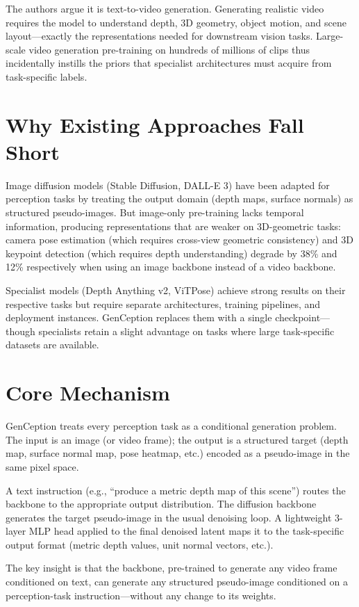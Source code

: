 \documentclass[10pt,twocolumn]{article}
\begin{document}
The authors argue it is text-to-video generation. Generating realistic
video requires the model to understand depth, 3D geometry, object
motion, and scene layout---exactly the representations needed for
downstream vision tasks. Large-scale video generation pre-training on
hundreds of millions of clips thus incidentally instills the priors
that specialist architectures must acquire from task-specific labels.

\section{Why Existing Approaches Fall Short}

Image diffusion models (Stable Diffusion, DALL-E 3) have been adapted
for perception tasks by treating the output domain (depth maps, surface
normals) as structured pseudo-images. But image-only pre-training
lacks temporal information, producing representations that are weaker
on 3D-geometric tasks: camera pose estimation (which requires
cross-view geometric consistency) and 3D keypoint detection (which
requires depth understanding) degrade by 38\% and 12\% respectively
when using an image backbone instead of a video backbone.

Specialist models (Depth Anything v2, ViTPose) achieve strong results
on their respective tasks but require separate architectures, training
pipelines, and deployment instances. GenCeption replaces them with
a single checkpoint---though specialists retain a slight advantage
on tasks where large task-specific datasets are available.

\section{Core Mechanism}

GenCeption treats every perception task as a conditional generation
problem. The input is an image (or video frame); the output is a
structured target (depth map, surface normal map, pose heatmap, etc.)
encoded as a pseudo-image in the same pixel space.

A text instruction (e.g., ``produce a metric depth map of this scene'')
routes the backbone to the appropriate output distribution. The
diffusion backbone generates the target pseudo-image in the usual
denoising loop. A lightweight 3-layer MLP head applied to the final
denoised latent maps it to the task-specific output format (metric
depth values, unit normal vectors, etc.).

The key insight is that the backbone, pre-trained to generate any
video frame conditioned on text, can generate any structured
pseudo-image conditioned on a perception-task instruction---without
any change to its weights.
\end{document}
